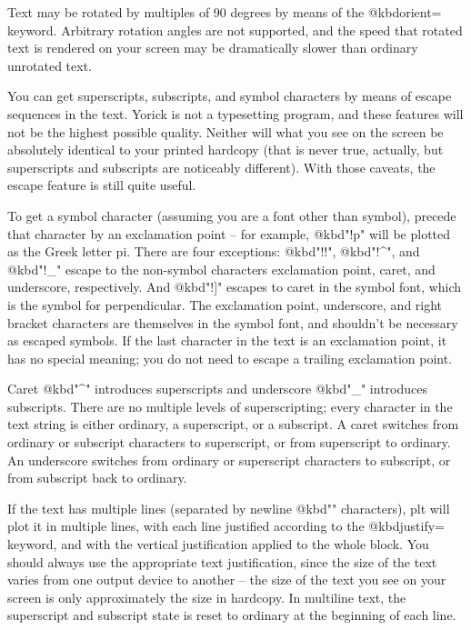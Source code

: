 Text may be rotated by multiples of 90 degrees by means of the
@kbd{orient=} keyword.  Arbitrary rotation angles are not supported, and
the speed that rotated text is rendered on your screen may be
dramatically slower than ordinary unrotated text.

You can get superscripts, subscripts, and symbol characters by means
of escape sequences in the text.  Yorick is not a typesetting program,
and these features will not be the highest possible quality.  Neither
will what you see on the screen be absolutely identical to your
printed hardcopy (that is never true, actually, but superscripts and
subscripts are noticeably different).  With those caveats, the escape
feature is still quite useful.

To get a symbol character (assuming you are a font other than symbol),
precede that character by an exclamation point -- for example,
@kbd{"!p"} will be plotted as the Greek letter pi.  There are four
exceptions: @kbd{"!!"}, @kbd{"!^"}, and @kbd{"!_"} escape to the
non-symbol characters exclamation point, caret, and underscore,
respectively.  And @kbd{"!]"} escapes to caret in the symbol font, which
is the symbol for perpendicular.  The exclamation point, underscore, and
right bracket characters are themselves in the symbol font, and
shouldn't be necessary as escaped symbols.  If the last character
in the text is an exclamation point, it has no special meaning; you
do not need to escape a trailing exclamation point.

Caret @kbd{"^"} introduces superscripts and underscore @kbd{"_"}
introduces subscripts.  There are no multiple levels of superscripting;
every character in the text string is either ordinary, a superscript, or
a subscript.  A caret switches from ordinary or subscript characters to
superscript, or from superscript to ordinary.  An underscore switches
from ordinary or superscript characters to subscript, or from subscript
back to ordinary.

If the text has multiple lines (separated by newline @kbd{"\n"}
characters), plt will plot it in multiple lines, with each line
justified according to the @kbd{justify=} keyword, and with the vertical
justification applied to the whole block.  You should always use the
appropriate text justification, since the size of the text varies
from one output device to another -- the size of the text you see on
your screen is only approximately the size in hardcopy.  In multiline
text, the superscript and subscript state is reset to ordinary at
the beginning of each line.

